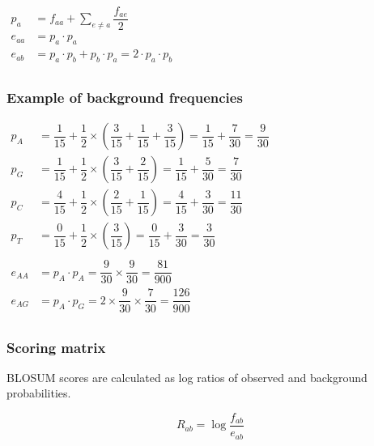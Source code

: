 \begin{center}
$\begin{aligned}
p_a &= f_{aa} + \sum_{e \neq a}{} \dfrac{f_{ae}}{2}\\
e_{aa} &= p_a \cdot p_a\\
e_{ab} &= p_a \cdot p_b + p_b \cdot p_a = 2 \cdot p_a \cdot p_b \\
\end{aligned} $
\end{center}

%
%
\subsubsection*{Example of background frequencies}

\begin{center}
$\begin{aligned}
p_A &= \dfrac{1}{15}  + \dfrac{1}{2}  \times \left( \dfrac{3}{15}  + \dfrac{1}{15} + \dfrac{3}{15} \right) 
   = \dfrac{1}{15}  + \dfrac{7}{30} 
   = \dfrac{9}{30} \\
p_G &= \dfrac{1}{15}  + \dfrac{1}{2}  \times \left( \dfrac{3}{15}  + \dfrac{2}{15} \right) 
   = \dfrac{1}{15}  + \dfrac{5}{30} 
   = \dfrac{7}{30} \\
p_C &= \dfrac{4}{15}  + \dfrac{1}{2}  \times \left( \dfrac{2}{15}  + \dfrac{1}{15} \right) 
   = \dfrac{4}{15}  + \dfrac{3}{30} 
   = \dfrac{11}{30} \\
p_T &= \dfrac{0}{15}  + \dfrac{1}{2}  \times \left( \dfrac{3}{15}  \right) 
   = \dfrac{0}{15}  + \dfrac{3}{30} 
   = \dfrac{3}{30} \\ \\
e_{AA} &= p_A \cdot p_A = \dfrac{9}{30}  \times \dfrac{9}{30} = \dfrac{81}{900} \\
e_{AG} &= p_A \cdot p_G = 2 \times \dfrac{9}{30}  \times \dfrac{7}{30} = \dfrac{126}{900} \\
\end{aligned} $
\end{center}

%
%
\subsubsection*{Scoring matrix}
BLOSUM scores are calculated as log ratios of observed and background probabilities.

\[
R_{ab} = \log \dfrac{f_{ab}}{e_{ab}}
\]

%
%
